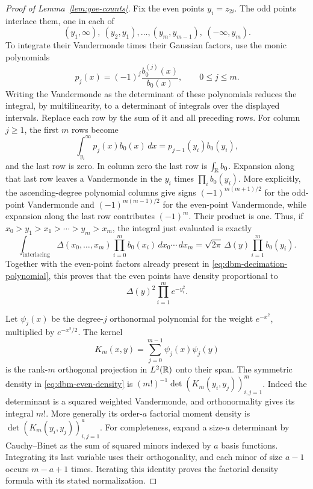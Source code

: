 \begin{proof}[Proof of Lemma~\ref{lem:goe-counts}]
Fix the even points \(y_i=z_{2i}\).
The odd points interlace them, one in each of
\[
 (y_1,\infty),\ (y_2,y_1),\ldots,(y_m,y_{m-1}),\
 (-\infty,y_m).
\]
To integrate their Vandermonde times their Gaussian factors, use
the monic polynomials
\[
 p_j(x)=(-1)^j\frac{b_0^{(j)}(x)}{b_0(x)},
 \qquad 0\le j\le m.
\]
Writing the Vandermonde as the determinant of these polynomials
reduces the integral, by multilinearity, to a determinant of
integrals over the displayed intervals. Replace each row by the
sum of it and all preceding rows. For column \(j\ge1\), the first
\(m\) rows become
\[
 \int_{y_i}^\infty p_j(x)b_0(x)\,d x
       =p_{j-1}(y_i)b_0(y_i),
\]
and the last row is zero. In column zero the last row is
\(\int_\mathbb R b_0\).
Expansion along that last row leaves a Vandermonde in the \(y_i\)
times \(\prod_i b_0(y_i)\).
More explicitly, the ascending-degree polynomial columns give signs
\((-1)^{m(m+1)/2}\) for the odd-point Vandermonde and
\((-1)^{m(m-1)/2}\) for the even-point Vandermonde, while expansion
along the last row contributes \((-1)^m\). Their product is one.
Thus, if \(x_0>y_1>x_1>\cdots>y_m>x_m\), the integral just evaluated
is exactly
\[
 \int_{\text{interlacing}}
        \Delta(x_0,\ldots,x_m)\prod_{i=0}^m b_0(x_i)
                \,d x_0\cdots\,d x_m
     =\sqrt{2\pi}\,\Delta(y)\prod_{i=1}^m b_0(y_i).
\]
Together with the even-point factors already present in
\eqref{eq:dbm-decimation-polynomial}, this proves that the even
points have density proportional to
\begin{equation}
 \label{eq:dbm-even-density}
 \Delta(y)^2\prod_{i=1}^m e^{-y_i^2}.
\end{equation}

Let \(\psi_j(x)\) be the degree-\(j\) orthonormal polynomial for
the weight \(e^{-x^2}\), multiplied by \(e^{-x^2/2}\).
The kernel
\[
 K_m(x,y)=\sum_{j=0}^{m-1}\psi_j(x)\psi_j(y)
\]
is the rank-\(m\) orthogonal projection in \(L^2(\mathbb R)\) onto their
span. The symmetric density in \eqref{eq:dbm-even-density} is
\((m!)^{-1}\det(K_m(y_i,y_j))_{i,j=1}^m\).
Indeed the determinant is a squared weighted Vandermonde, and
orthonormality gives its integral \(m!\).
More generally its order-\(a\) factorial moment density is
\(\det(K_m(y_i,y_j))_{i,j=1}^a\).
For completeness, expand a size-\(a\) determinant by Cauchy--Binet
as the sum of squared minors indexed by \(a\) basis functions.
Integrating its last variable uses their orthogonality, and each
minor of size \(a-1\) occurs \(m-a+1\) times. Iterating this identity
proves the factorial density formula with its stated normalization.


\end{proof}
